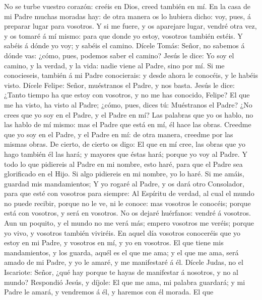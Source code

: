  No se turbe vuestro corazón: creéis en Dios, creed también
en mí.  En la casa de mi Padre muchas moradas hay: de otra
manera os lo hubiera dicho: voy, pues, á preparar lugar para vosotros.
 Y si me fuere, y os aparejare lugar, vendré otra vez, y os
tomaré á mí mismo: para que donde yo estoy, vosotros también estéis.
 Y sabéis á dónde yo voy; y sabéis el camino. 
Dícele Tomás: Señor, no sabemos á dónde vas: ¿cómo, pues, podemos saber
el camino?  Jesús le dice: Yo soy el camino, y la verdad, y
la vida: nadie viene al Padre, sino por mí.  Si me
conocieseis, también á mi Padre conocierais: y desde ahora le conocéis,
y le habéis visto.  Dícele Felipe: Señor, muéstranos el
Padre, y nos basta.  Jesús le dice: ¿Tanto tiempo ha que
estoy con vosotros, y no me has conocido, Felipe? El que me ha visto, ha
visto al Padre; ¿cómo, pues, dices tú: Muéstranos el Padre?
 ¿No crees que yo soy en el Padre, y el Padre en mí? Las
palabras que yo os hablo, no las hablo de mí mismo: mas el Padre que
está en mí, él hace las obras.  Creedme que yo soy en el
Padre, y el Padre en mí: de otra manera, creedme por las mismas obras.
 De cierto, de cierto os digo: El que en mí cree, las obras
que yo hago también él las hará; y mayores que éstas hará; porque yo voy
al Padre.  Y todo lo que pidiereis al Padre en mi nombre,
esto haré, para que el Padre sea glorificado en el Hijo. 
Si algo pidiereis en mi nombre, yo lo haré.  Si me amáis,
guardad mis mandamientos;  Y yo rogaré al Padre, y os dará
otro Consolador, para que esté con vosotros para siempre: 
Al Espíritu de verdad, al cual el mundo no puede recibir, porque no le
ve, ni le conoce: mas vosotros le conocéis; porque está con vosotros, y
será en vosotros.  No os dejaré huérfanos: vendré á
vosotros.  Aun un poquito, y el mundo no me verá más;
empero vosotros me veréis; porque yo vivo, y vosotros también viviréis.
 En aquel día vosotros conoceréis que yo estoy en mi Padre,
y vosotros en mí, y yo en vosotros.  El que tiene mis
mandamientos, y los guarda, aquél es el que me ama; y el que me ama,
será amado de mi Padre, y yo le amaré, y me manifestaré á él.
 Dícele Judas, no el Iscariote: Señor, ¿qué hay porque te
hayas de manifestar á nosotros, y no al mundo?  Respondió
Jesús, y díjole: El que me ama, mi palabra guardará; y mi Padre le
amará, y vendremos á él, y haremos con él morada.  El que
